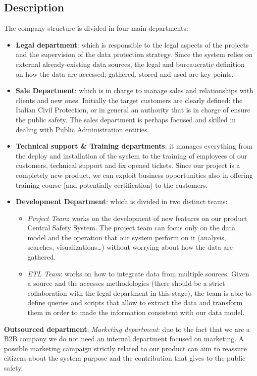 \documentclass[../main.tex]{subfiles}
\begin{document}
    \subsection{Description}
    The company structure is divided in four main departments:
    \begin{itemize}
        \item \textbf{Legal department}: which is responsible to the legal aspects of the projects and the supervision of the data protection strategy. Since the system relies on external already-existing data sources, the legal and bureaucratic definition on how the data are accessed, gathered, stored and used are key points.
        \item \textbf{Sale Department}: which is in charge to manage sales and relationships with clients and new ones. Initially the target customers are clearly defined: the Italian Civil Protection, or in general an authority that is in charge of ensure the public safety. The sales department is perhaps focused and skilled in dealing with Public Administration entities.
        \item \textbf{Technical support \& Training departments}:  it manages everything from the deploy and installation of the system to the training of employees of our customers, technical support and fix opened tickets. Since our project is a completely new product, we can exploit business opportunities also in offering training course (and potentially certification) to the customers.
        \item \textbf{Development Department}: which is divided in two distinct teams:
        \begin{itemize}
            \item \textit{Project Team}: works on the development of new features on our product Central Safety System. The project team can focus only on the data model and the operation that our system perform on it (analysis, searches, visualizations…) without worrying about how the data are gathered.
            \item \textit{ETL Team}: works on how to integrate data from multiple sources. Given a source and the accesses methodologies (there should be a strict collaboration with the legal department in this stage), the team is able to define queries and scripts that allow to extract the data and transform them in order to made the information consistent with our data model.
        \end{itemize}
    \end{itemize}
    \textbf{Outsourced department}:
    \textit{Marketing department}: due to the fact that we are a B2B company we do not need an internal department focused on marketing. A possible marketing campaign strictly related to our product can aim to reassure citizens about the system purpose and the contribution that gives to the public safety.
\end{document}
